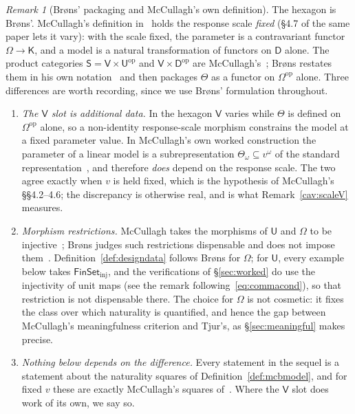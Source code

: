 \documentclass[11pt,a4paper]{article}
\theoremstyle{plain}
\theoremstyle{definition}
\theoremstyle{remark}
\newtheorem{remark}[theorem]{Remark}
\newcommand{\cat}[1]{\mathsf{#1}}
\newcommand{\catU}{\cat{U}}
\newcommand{\catV}{\cat{V}}
\newcommand{\catO}{\cat{\Omega}}
\newcommand{\catS}{\cat{S}}
\newcommand{\catD}{\cat{D}}
\newcommand{\catK}{\cat{K}}
\newcommand{\FinSet}{\cat{FinSet}}
\newcommand{\op}{\mathrm{op}}
\begin{document}
\begin{remark}[Br\o ns' packaging and McCullagh's own definition]
The hexagon is Br\o ns'. McCullagh's definition
in~\cite[\S4.2]{mccullagh_what_2002} holds the response scale \emph{fixed}
(\S4.7 of the same paper lets it vary): with the scale fixed, the parameter is a
contravariant functor $\catO \to \catK$, and a model is a natural transformation
of functors on $\catD$ alone. The product categories
$\catS = \catV \times \catU^{\op}$ and
$\catV \times \catD^{\op}$ are McCullagh's~\cite[\S4.7, p.~1240]{mccullagh_what_2002};
Br\o ns restates them in his own notation~\cite[p.~1280]{brons_discussion_2002}
and then packages $\Theta$ as a functor on $\catO^{\op}$ alone. Three differences are worth recording, since we use
Br\o ns' formulation throughout.

\begin{enumerate}
\item[(i)] \emph{The $\catV$ slot is additional data.} In the hexagon $\catV$
varies while $\Theta$ is defined on $\catO^{\op}$ alone, so a non-identity
response-scale morphism constrains the model at a fixed parameter value. In
McCullagh's own worked construction the parameter of a linear model is a
subrepresentation $\Theta_{\omega} \subseteq v^{\omega}$ of the standard
representation~\cite[p.~1235]{mccullagh_what_2002}, and therefore \emph{does}
depend on the response scale. The two agree exactly when $v$ is held fixed,
which is the hypothesis of McCullagh's \S\S4.2--4.6; the discrepancy is otherwise real,
and is what Remark~\ref{cav:scaleV} measures.
\item[(ii)] \emph{Morphism restrictions.} McCullagh takes the morphisms of
$\catU$ and $\catO$ to be injective~\cite[\S4.1]{mccullagh_what_2002}; Br\o ns
judges such restrictions dispensable and does not impose
them~\cite[p.~1281]{brons_discussion_2002}. Definition~\ref{def:designdata}
follows Br\o ns for $\catO$; for $\catU$, every example below takes
$\FinSet_{\mathrm{inj}}$, and the verifications of \S\ref{sec:worked} do use
the injectivity of unit maps (see the remark following~\eqref{eq:commacond}),
so that restriction is not dispensable there. The choice for $\catO$ is not
cosmetic: it fixes the class over which
naturality is quantified, and hence the gap between McCullagh's meaningfulness
criterion and Tjur's, as \S\ref{sec:meaningful} makes precise.
\item[(iii)] \emph{Nothing below depends on the difference.} Every statement
in the sequel is a statement about the naturality squares of
Definition~\ref{def:mcbmodel}, and for fixed $v$ these are exactly McCullagh's
squares of~\cite[p.~1236]{mccullagh_what_2002}. Where the $\catV$ slot does
work of its own, we say so.
\end{enumerate}
\end{remark}
\end{document}
